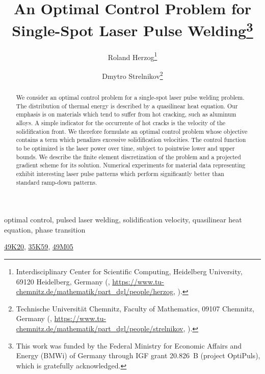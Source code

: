 \documentclass{numapde-preprint}
\title{An Optimal Control Problem for Single-Spot Laser Pulse Welding\thanks{This work was funded by the Federal Ministry for Economic Affairs and Energy (BMWi) of Germany through IGF grant 20.826~B (project OptiPuls), which is gratefully acknowledged.}}
\subtitle{}
\author{Roland Herzog\thanks{Interdisciplinary Center for Scientific Computing, Heidelberg University, 69120 Heidelberg, Germany (\email{roland.herzog@mathematik.tu-chemnitz.de}, \url{https://www.tu-chemnitz.de/mathematik/part_dgl/people/herzog}, \orcid{0000-0003-2164-6575}).}
\and
Dmytro Strelnikov\thanks{Technische Universität Chemnitz, Faculty of Mathematics, 09107 Chemnitz, Germany (\email{dmytro.strelnikov@mathematik.tu-chemnitz.de}, \url{https://www.tu-chemnitz.de/mathematik/part_dgl/people/strelnikov}, \orcid{0000-0002-7668-3640}).}}
\begin{document}
\maketitle

\begin{abstract}
We consider an optimal control problem for a single-spot laser pulse welding problem.
The distribution of thermal energy is described by a quasilinear heat equation.
Our emphasis is on materials which tend to suffer from hot cracking, such as aluminum alloys.
A simple indicator for the occurrente of hot cracks is the velocity of the solidification front.
We therefore formulate an optimal control problem whose objective contains a term which penalizes excessive solidification velocities.
The control function to be optimized is the laser power over time, subject to pointwise lower and upper bounds.
We describe the finite element discretization of the problem and a projected gradient scheme for its solution.
Numerical experiments for material data representing  exhibit interesting laser pulse patterns which perform significantly better than standard ramp-down patterns.\end{abstract}

\begin{keywords}
optimal control, pulsed laser welding, solidification velocity, quasilinear heat equation, phase transition\end{keywords}

\begin{AMS}
\href{https://mathscinet.ams.org/msc/msc2010.html?t=49K20}{49K20}, \href{https://mathscinet.ams.org/msc/msc2010.html?t=35K59}{35K59}, \href{https://mathscinet.ams.org/msc/msc2010.html?t=49M05}{49M05}
\end{AMS}



\printbibliography
\end{document}
